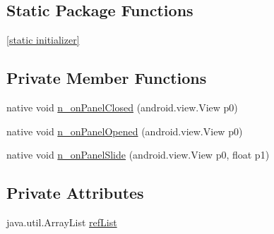 \subsection*{Static Package Functions}
\begin{CompactItemize}
\item 
\hyperlink{classmono_1_1android_1_1support_1_1v4_1_1widget_1_1_sliding_pane_layout___panel_slide_listener_implementor_77b3680ad0df65b80cd2e4feeb685789}{\mbox{[}static initializer\mbox{]}}
\end{CompactItemize}
\subsection*{Private Member Functions}
\begin{CompactItemize}
\item 
native void \hyperlink{classmono_1_1android_1_1support_1_1v4_1_1widget_1_1_sliding_pane_layout___panel_slide_listener_implementor_1dd73f4dad6def6f31d207173da4505f}{n\_\-onPanelClosed} (android.view.View p0)
\item 
native void \hyperlink{classmono_1_1android_1_1support_1_1v4_1_1widget_1_1_sliding_pane_layout___panel_slide_listener_implementor_3af0345b0eaa574878e9b1dc551daec4}{n\_\-onPanelOpened} (android.view.View p0)
\item 
native void \hyperlink{classmono_1_1android_1_1support_1_1v4_1_1widget_1_1_sliding_pane_layout___panel_slide_listener_implementor_e905b1a2689057ac0bfc8f498f6131c7}{n\_\-onPanelSlide} (android.view.View p0, float p1)
\end{CompactItemize}
\subsection*{Private Attributes}
\begin{CompactItemize}
\item 
java.util.ArrayList \hyperlink{classmono_1_1android_1_1support_1_1v4_1_1widget_1_1_sliding_pane_layout___panel_slide_listener_implementor_83018c087ce3d6a4d5e71746eab874ad}{refList}
\end{CompactItemize}


